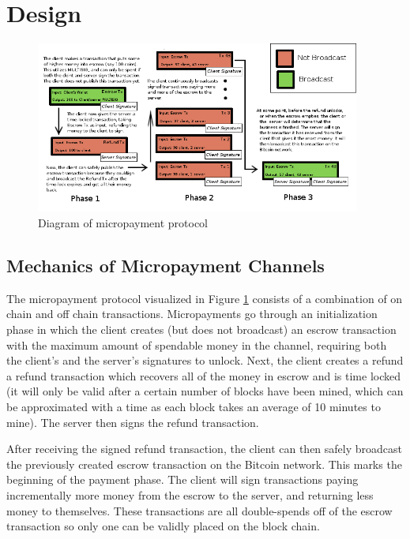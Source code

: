 \section{Design}
\label{sec:design}

\begin{figure}
  \centering
  \includegraphics[width=0.95\textwidth]{microtransactions.png}
  \caption{Diagram of micropayment protocol}
  \label{fig:micropayment-protocol}
\end{figure}

\subsection{Mechanics of Micropayment Channels}

The micropayment protocol visualized in Figure \ref{fig:micropayment-protocol} consists of a combination of on chain and off chain transactions. Micropayments go through an initialization phase in which the client creates (but does not broadcast) an escrow transaction with the maximum amount of spendable money in the channel, requiring both the client's and the server's signatures to unlock. Next, the client creates a refund a refund transaction which recovers all of the money in escrow and is time locked (it will only be valid after a certain number of blocks have been mined, which can be approximated with a time as each block takes an average of 10 minutes to mine). The server then signs the refund transaction. 

After receiving the signed refund transaction, the client can then safely broadcast the previously created escrow transaction on the Bitcoin network. This marks the beginning of the payment phase. The client will sign transactions paying incrementally more money from the escrow to the server, and returning less money to themselves. These transactions are all double-spends off of the escrow transaction so only one can be validly placed on the block chain.

